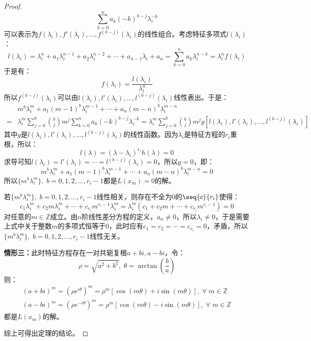 \begin{proof}
\begin{equation*}
		\sum_{k=0}^{n}a_k(-k)^{b-j}\lambda_i^{-k}
	\end{equation*}
	可以表示为$f(\lambda_i),f'(\lambda_i),\dots,f^{(b-j)}(\lambda_i)$的线性组合。考虑特征多项式$l(\lambda_i)$：
	\begin{equation*}
		l(\lambda_i)=\lambda_i^n+a_1\lambda_i^{n-1}+a_2\lambda_i^{n-2}+\cdots+a_{n-1}\lambda_i+a_n=\sum_{k=0}^{n}a_k\lambda_i^{n-k}=\lambda_i^nf(\lambda_i)
	\end{equation*}
	于是有：
	\begin{equation*}
		f(\lambda_i)=\frac{l(\lambda_i)}{\lambda_i^n}
	\end{equation*}
	所以$f^{(b-j)}(\lambda_i)$可以由$l(\lambda_i),l'(\lambda_i),\dots,l^{(b-j)}(\lambda_i)$线性表出。于是：
	\begin{align*}
		&m^{b}\lambda_i^m+a_1(m-1)^{b}\lambda_i^{m-1}+\cdots+a_{n}(m-n)^{b}\lambda_i^{m-n} \\
		=&\lambda_i^m\sum_{j=0}^{b}\binom{b}{j}m^j\sum_{k=0}^{n}a_k(-k)^{b-j}\lambda_i^{-k}=\lambda_i^m\sum_{j=0}^{b}\binom{b}{j}m^jg[l(\lambda_i),l'(\lambda_i),\dots,l^{(b-j)}(\lambda_i)]
	\end{align*}
	其中$g$是$l(\lambda_i),l'(\lambda_i),\dots,l^{(b-j)}(\lambda_i)$的线性函数。因为$\lambda_i$是特征方程的$r_i$重根，所以：
	\begin{equation*}
		l(\lambda)=(\lambda-\lambda_i)^{r_i}h(\lambda)=0
	\end{equation*}
	求导可知$l(\lambda_i)=l'(\lambda_i)=\cdots=l^{(b-j)}(\lambda_i)=0$，所以$g=0$，即：
	\begin{equation*}
		m^{b}\lambda_i^m+a_1(m-1)^{b}\lambda_i^{m-1}+\cdots+a_{n}(m-n)^{b}\lambda_i^{m-n}=0
	\end{equation*}
	所以$\{m^b\lambda_i^m\},\;b=0,1,2,\dots,r_i-1$都是$L(x_m)=0$的解。\par
	若$\{m^b\lambda_i^m\},\;b=0,1,2,\dots,r_i-1$线性相关，则存在不全为$0$的$\seq{c}{r_i}$使得：
	\begin{equation*}
		c_1\lambda_i^m+c_2m\lambda_i^m+\cdots+c_{r_i}m^{r_i-1}\lambda_i^m=\lambda_i^m(c_1+c_2m+\cdots+c_{r_i}m^{r_i-1})=0
	\end{equation*}
	对任意的$m\in\mathbb{Z}$成立。由$n$阶线性差分方程的定义，$a_n\ne0$，所以$\lambda_i\ne0$，于是需要上式中关于整数$m$的多项式恒等于$0$，此时应有$c_1=c_2=\cdots=c_{r_i}=0$，矛盾，所以$\{m^b\lambda_i^m\},\;b=0,1,2,\dots,r_i-1$线性无关。\par
	\textbf{情形三：}此时特征方程存在一对共轭复根$a+bi,a-bi$，令：
	\begin{equation*}
		\rho=\sqrt{a^2+b^2},\;\theta=\arctan\left(\frac{b}{a}\right)
	\end{equation*}
	则：
	\begin{gather*}
		(a+bi)^m=(\rho e^{i\theta})^m=\rho^m[\cos(m\theta)+i\sin(m\theta)],\;\forall\;m\in\mathbb{Z}^{} \\
		(a-bi)^m=(\rho e^{-i\theta})^m=\rho^m[\cos(m\theta)-i\sin(m\theta)],\;\forall\;m\in\mathbb{Z}^{}
	\end{gather*}
	都是$L(x_m)$的解。\par
	综上可得出定理的结论。
\end{proof}
